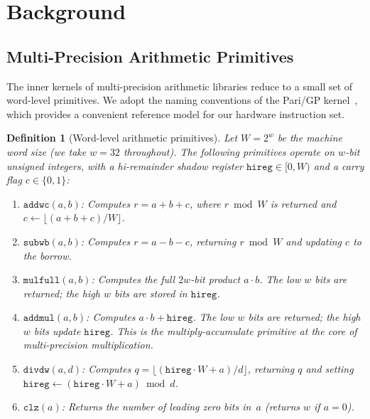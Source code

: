 \documentclass[11pt,a4paper]{article}
\newtheorem{definition}{Definition}
\begin{document}
\section{Background}
\label{sec:background}

\subsection{Multi-Precision Arithmetic Primitives}
\label{sec:mp-primitives}

The inner kernels of multi-precision arithmetic libraries reduce to a small set
of word-level primitives.  We adopt the naming conventions of the Pari/GP
kernel~\cite{parigp2024,cohen1993}, which provides a convenient reference model
for our hardware instruction set.

\begin{definition}[Word-level arithmetic primitives]
\label{def:primitives}
Let $W = 2^{w}$ be the machine word size (we take $w = 32$ throughout).  The
following primitives operate on $w$-bit unsigned integers, with a
\emph{hi-remainder} shadow register $\mathtt{hireg} \in [0, W)$ and a carry
flag $c \in \{0, 1\}$:
\begin{enumerate}[leftmargin=*,label=(\roman*)]
  \item $\mathtt{addwc}(a, b)$: Computes $r = a + b + c$, where $r \bmod W$
    is returned and $c \leftarrow \lfloor (a + b + c) / W \rfloor$.
  \item $\mathtt{subwb}(a, b)$: Computes $r = a - b - c$, returning
    $r \bmod W$ and updating $c$ to the borrow.
  \item $\mathtt{mulfull}(a, b)$: Computes the full $2w$-bit product
    $a \cdot b$.  The low $w$ bits are returned; the high $w$ bits are
    stored in $\mathtt{hireg}$.
  \item $\mathtt{addmul}(a, b)$: Computes $a \cdot b + \mathtt{hireg}$.
    The low $w$ bits are returned; the high $w$ bits update
    $\mathtt{hireg}$.  This is the multiply-accumulate primitive at the
    core of multi-precision multiplication.
  \item $\mathtt{divdw}(a, d)$: Computes $q = \lfloor (\mathtt{hireg}
    \cdot W + a) / d \rfloor$, returning $q$ and setting
    $\mathtt{hireg} \leftarrow (\mathtt{hireg} \cdot W + a) \bmod d$.
  \item $\mathtt{clz}(a)$: Returns the number of leading zero bits
    in~$a$ (returns $w$ if $a = 0$).
\end{enumerate}
\end{definition}
\end{document}
